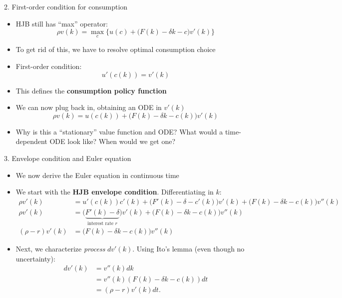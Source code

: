 \documentclass[10pt]{beamer}
\begin{document}
\begin{frame}{2. First-order condition for consumption}
\begin{itemize}
\item HJB still has ``max'' operator:
\begin{equation*}
	\rho v(k) = \max_c \Big\{ u(c) + \Big( F(k) - \delta k - c \Big) v'(k) \Big\}
\end{equation*}

\item To get rid of this, we have to resolve optimal consumption choice

\item First-order condition:
\begin{equation*}
	u'(c(k)) = v'(k)
\end{equation*}

\item This defines the \textbf{consumption policy function}

\item We can now plug back in, obtaining an ODE in $v'(k)$
\begin{equation*}
	\rho v(k) = u(c(k)) + \Big( F(k) - \delta k - c(k) \Big) v'(k)
\end{equation*}

\item Why is this a “stationary” value function and ODE? What would a time-dependent ODE look like? When would we get one?
\end{itemize}
\end{frame}



\begin{frame}{3. Envelope condition and Euler equation}
\begin{itemize}
\item We now derive the Euler equation in continuous time

\item We start with the \textbf{HJB envelope condition}. Differentiating in $k$:
\begin{align*}
	\rho v'(k) &= u'(c(k)) c'(k) + \Big( F'(k) - \delta - c'(k) \Big) v'(k) + \Big( F(k) - \delta k - c(k) \Big) v''(k) \\
	\rho v'(k) &= \Big( \underbrace{ F'(k) - \delta}_\text{interest rate $r$} \Big) v'(k) + \Big( F(k) - \delta k - c(k) \Big) v''(k) \\
	(\rho - r) v'(k) &= \Big( F(k) - \delta k - c(k) \Big) v''(k)
\end{align*}

\item Next, we characterize \textit{process} $d v'(k)$. Using Ito's lemma (even though no uncertainty):
\begin{align*}
	d v'(k) &= v''(k) dk \\
	&= v''(k) (F(k) - \delta k - c(k)) dt \\
	&= (\rho - r) v'(k) dt.
\end{align*}
\end{itemize}
\end{frame}
\end{document}
